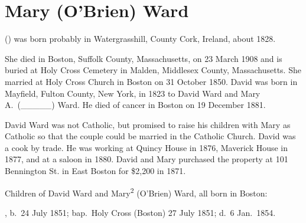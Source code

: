 \section{Mary (O'Brien) Ward}\label{per:Mary2OBrien}

 () was born probably in Watergrasshill, County Cork, Ireland, about 1828.{\cite{Mary2OBrienMarriage:1} She died in Boston, Suffolk County, Massachusetts, on 23 March 1908\cite{Mary2OBrienDeath:2} and is buried at Holy Cross Cemetery in Malden, Middlesex County, Massachusetts.\cite{CarolGordon:8} She married  at Holy Cross Church in Boston on 31 October 1850.\cite{Mary2OBrienMarriage:2} David was born in Mayfield, Fulton County, New York, in 1823\cite{DavidWardObit} to David Ward and Mary A.\ (\_\_\_\_\_) Ward.\cite{DavidWardDeath:1} He died of cancer in Boston on 19 December 1881.\cite{DavidWardDeath:2}
	
David Ward was not Catholic, but promised to raise his children with Mary as Catholic so that the couple could be married in the Catholic Church.\cite{Mary2OBrienMarriage2:2} David was a cook by trade. He was working at Quincy House in 1876,\cite{DavidWard1876} Maverick House in 1877,\cite{DavidWard1877} and at a saloon in 1880.\cite{Census1880DavidWard:1} David and Mary purchased the property at 101 Bennington St. in East Boston for \$2,200 in 1871.\cite{101Bennington:1}

\begin{KidsIntro}
	Children of David Ward and Mary\textsuperscript{2} (O'Brien) Ward, all born in Boston:
\end{KidsIntro}

\begin{Kids}
	
	, b.\ 24 July 1851;\cite{MaryAnn3WardBaptism:1} bap.\ Holy Cross (Boston) 27 July 1851;\cite{MaryAnn3WardBaptism:2} d.\ 6 Jan.\ 1854.\cite{MaryAnn3WardDeath}
	

\end{Kids}}
